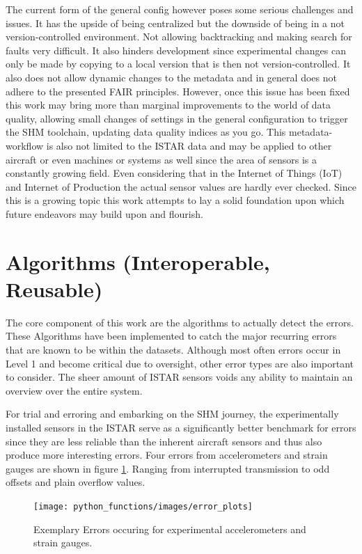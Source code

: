 The current form of the general config however poses some serious challenges and issues. It has the upside of being centralized but the downside of being in a not version-controlled environment. Not allowing backtracking and making search for faults very difficult. It also hinders development since experimental changes can only be made by copying to a local version that is then not version-controlled. It also does not allow dynamic changes to the metadata and in general does not adhere to the presented FAIR principles. However, once this issue has been fixed this work may bring more than marginal improvements to the world of data quality, allowing small changes of settings in the general configuration to trigger the SHM toolchain, updating data quality indices as you go. This metadata-workflow is also not limited to the  ISTAR data and may be applied to other aircraft or even machines or systems as well since the area of sensors is a constantly growing field. Even considering that in the Internet of Things (IoT) and Internet of Production the actual sensor values are hardly ever checked. Since this is a growing topic this work attempts to lay a solid foundation upon which future endeavors may build upon and flourish.


\section{Algorithms (Interoperable, Reusable)}

The core component of this work are the algorithms to actually detect the errors. These Algorithms have been implemented to catch the major recurring errors that are known to be within the datasets. Although most often errors occur in Level 1 and become critical due to oversight, other error types are also important to consider. The sheer amount of ISTAR sensors voids any ability to maintain an overview over the entire system.

For trial and erroring and embarking on the SHM journey, the experimentally installed sensors in the ISTAR serve as a significantly better benchmark for errors since they are less reliable than the inherent aircraft sensors and thus also produce more interesting errors. Four errors from accelerometers and strain gauges are shown in figure \ref{fig:error_plots}. Ranging from interrupted transmission to odd offsets and plain overflow values.

\begin{figure}[h]
    \centering
    \texttt{[image: python\_functions/images/error\_plots]}
    \caption{Exemplary Errors occuring for experimental accelerometers and strain gauges.}
    \label{fig:error_plots}
\end{figure}



